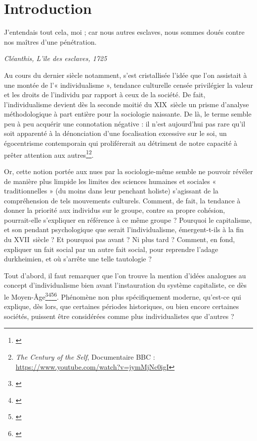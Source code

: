 \part*{Introduction}

\vspace*{\fill}
\epigraph{J’entendais tout cela, moi ; car nous autres esclaves, nous sommes doués contre nos maîtres d’une pénétration.}{\textit{Cléanthis, L'île des esclaves, 1725}}

\vfill\clearpage

Au cours du dernier siècle notamment, s’est cristallisée l’idée que l’on assistait à une montée de l'« individualisme », tendance culturelle censée privilégier la valeur et les droits de l'individu par rapport à ceux de la société. De fait, l'individualisme devient dès la seconde moitié du XIX\ieme ~siècle un prisme d’analyse méthodologique à part entière pour la sociologie naissante. De là, le terme semble peu à peu acquérir une connotation négative : il n’est aujourd’hui pas rare qu’il soit apparenté à la dénonciation d’une focalisation excessive sur le soi, un égocentrisme contemporain qui proliférerait au détriment de notre capacité à prêter attention aux autres\footnote{\cite{twenge_generation_2006}}\footnote{\textit{The Century of the Self}, Documentaire BBC : \url{https://www.youtube.com/watch?v=jymMjNc0igI}}.

Or, cette notion portée aux nues par la sociologie-même semble ne pouvoir révéler de manière plus limpide les limites des sciences humaines et sociales « traditionnelles » (du moins dans leur penchant holiste) s’agissant de la compréhension de tels mouvements culturels. Comment, de fait, la tendance à donner la priorité aux individus sur le groupe, contre sa propre cohésion, pourrait-elle s’expliquer en référence à ce même groupe ? Pourquoi le capitalisme, et son pendant psychologique que serait l’individualisme, émergent-t-ils à la fin du XVII\ieme ~siècle ? Et pourquoi pas avant ? Ni plus tard ? Comment, en fond, expliquer un fait social par un autre fait social, pour reprendre l'adage durkheimien, et où s’arrête une telle tautologie ?

Tout d’abord, il faut remarquer que l’on trouve la mention d’idées analogues au concept d’individualisme bien avant l’instauration du système capitaliste, ce dès le Moyen-Âge\footnote{\cite{payen_humanisme_1985}}\footnote{\cite{giddens_modernity_1991}}\footnote{\cite{gourevitch_naissance_1997}}\footnote{\cite{rosenwein_barbara_h_and_c_s_heppleston_y_2005}}. Phénomène non plus spécifiquement moderne, qu’est-ce qui explique, dès lors, que certaines périodes historiques, ou bien encore certaines sociétés, puissent être considérées comme plus individualistes que d’autres ? 

